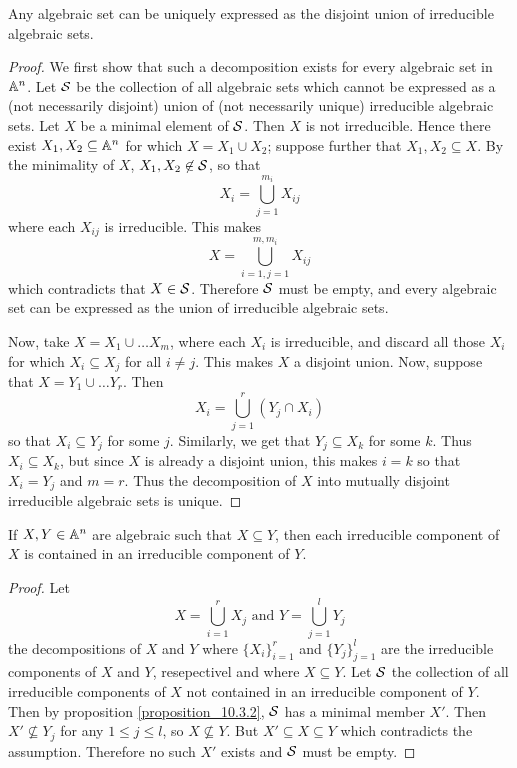 \begin{theorem}\label{theorem_10.3.3}
  Any algebraic set can be uniquely expressed as the disjoint union of
  irreducible algebraic sets.
\end{theorem}
\begin{proof}
  We first show that such a decomposition exists for every algebraic set in
  $\mathbb{A}^n$. Let  $\mathcal{S}$ be the collection of all algebraic sets which cannot be
  expressed as a (not necessarily disjoint) union of (not necessarily unique)
  irreducible algebraic sets. Let $X$ be a minimal element of $\mathcal{S}$. Then
  $X$ is not irreducible. Hence there exist $X_1, X_2 \subseteq \mathbb{A}^n$ for
  which $X=X_1 \cup X_2$; suppose further that $X_1,X_2 \subseteq X$. By the
  minimality of $X$,  $X_1, X_2 \not\in \mathcal{S}$, so that
  \begin{equation*}
    X_i=\bigcup_{j=1}^{m_i}{X_{ij}}
  \end{equation*}
  where each $X_{ij}$ is irreducible. This makes
  \begin{equation*}
    X=\bigcup_{i=1,j=1}^{m,m_i}{X_{ij}}
  \end{equation*}
  which contradicts that $X \in \mathcal{S}$. Therefore $\mathcal{S}$ must be empty, and every
  algebraic set can be expressed as the union of irreducible algebraic sets.

  Now, take  $X=X_1 \cup \dots X_m$, where each $X_i$ is irreducible, and
  discard all those $X_i$ for which  $X_i \subseteq X_j$ for all $i \neq j$.
  This makes $X$ a disjoint union. Now, suppose that  $X=Y_1 \cup \dots Y_r$.
  Then
  \begin{equation*}
    X_i=\bigcup_{j=1}^r{(Y_j \cap X_i)}
  \end{equation*}
  so that $X_i \subseteq Y_j$ for some $j$. Similarly, we get that  $Y_j
  \subseteq X_k$ for some $k$. Thus $X_i \subseteq X_k$, but since $X$ is
  already a disjoint union, this makes  $i=k$ so that $X_i=Y_j$ and $m=r$.
  Thus the decomposition of $X$ into mutually disjoint irreducible algebraic
  sets is unique.
\end{proof}
\begin{corollary}
  If $X,Y \in \mathbb{A}^n$ are algebraic such that $X \subseteq Y$, then each
  irreducible component of $X$ is contained in an irreducible component of
  $Y$.
\end{corollary}
\begin{proof}
  Let
  \begin{equation*}
    X=\bigcup_{i=1}^r{X_j} \text{ and } Y=\bigcup_{j=1}^l{Y_j}
  \end{equation*}
  the decompositions of $X$ and $Y$ where $\{X_i\}_{i=1}^r$ and
  $\{Y_j\}_{j=1}^l$ are the irreducible components of $X$ and $Y$,
  resepectivel and where  $X \subseteq Y$. Let $\mathcal{S}$ the collection of
  all irreducible components of  $X$ not contained in an irreducible
  component of $Y$. Then by proposition \ref{proposition_10.3.2},
  $\mathcal{S}$ has a minimal member $X'$. Then $X' \not\subseteq Y_j$ for any
  $1 \leq j \leq l$, so $X \not\subseteq Y$. But $X' \subseteq X
  \subseteq Y$ which contradicts the assumption. Therefore no such
  $X'$ exists and $\mathcal{S}$ must be empty.
\end{proof}
